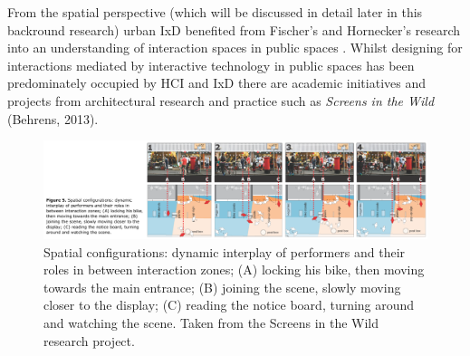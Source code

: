 From the spatial perspective (which will be discussed in detail later in this backround research) urban IxD benefited from Fischer's and Hornecker's research into an understanding of interaction spaces in public spaces \cite{Fischer_2012}.
Whilst designing for interactions mediated by interactive technology in public spaces has been predominately occupied by HCI and IxD there are academic initiatives and projects from architectural research and practice such as \textit{Screens in the Wild}  (Behrens, 2013).

\begin{figure}[htp]
  \centering
  \includegraphics[width=12cm]{Illustrations/SpatialConfig.png}
  \caption[Spatial configurations]{Spatial configurations: dynamic interplay of performers and their roles in between interaction zones; (A) locking his bike, then moving towards the main entrance; (B) joining the scene, slowly moving closer to the display; (C) reading the notice board, turning around and watching the scene. Taken from the Screens in the Wild  research project.}
  \label{SpatialConfig}
  \end{figure}

